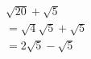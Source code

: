 \documentclass[preview]{standalone}
\begin{document}
\begin{align*}
& \sqrt{20} + \sqrt{5} \\&= \sqrt{4}\sqrt{5} + \sqrt{5}\\&= 2\sqrt{5} - \sqrt{5}
\end{align*}
\end{document}
